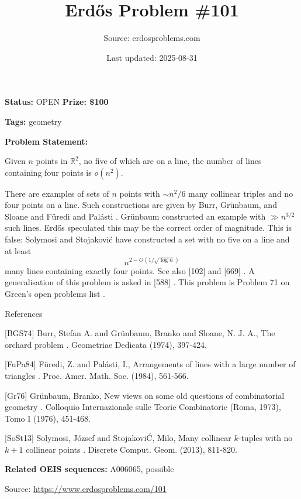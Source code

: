 \documentclass{article}
\title{Erd\H{o}s Problem \#101}
\date{Last updated: 2025-08-31}
\author{Source: erdosproblems.com}
\begin{document}
\maketitle

\noindent\textbf{Status:} OPEN \quad \textbf{Prize: \$100}

\noindent\textbf{Tags:} geometry

\medskip

\noindent\textbf{Problem Statement:}

Given $n$ points in $\mathbb{R}^2$, no five of which are on a line, the number of lines containing four points is $o(n^2)$.




There are examples of sets of $n$ points with $\sim n^2/6$ many collinear triples and no four points on a line. Such constructions are given by Burr, Gr\"{u}nbaum, and Sloane \cite{BGS74} and F\"{u}redi and Pal\'{a}sti \cite{FuPa84}. Gr\"{u}nbaum \cite{Gr76} constructed an example with $\gg n^{3/2}$ such lines. Erd\H{o}s speculated this may be the correct order of magnitude. This is false: Solymosi and Stojakovi\'{c} \cite{SoSt13} have constructed a set with no five on a line and at least\[n^{2-O(1/\sqrt{\log n})}\]many lines containing exactly four points. See also [102] and [669] . A generalisation of this problem is asked in [588] . This problem is Problem 71 on Green's open problems list .




References

[BGS74] Burr, Stefan A. and Gr\"{u}nbaum, Branko and Sloane, N. J. A., The orchard problem . Geometriae Dedicata (1974), 397-424.

[FuPa84] F\"{u}redi, Z. and Pal\'{a}sti, I., Arrangements of lines with a large number of triangles . Proc. Amer. Math. Soc. (1984), 561-566.

[Gr76] Gr\"{u}nbaum, Branko, New views on some old questions of combinatorial geometry . Colloquio Internazionale sulle Teorie Combinatorie (Roma, 1973), Tomo I (1976), 451-468.

[SoSt13] Solymosi, J\'{o}zsef and Stojakovi\'C, Milo\vS, Many collinear {$k$}-tuples with no {$k+1$} collinear points . Discrete Comput. Geom. (2013), 811-820.

\noindent\textbf{Related OEIS sequences:} A006065, possible


\bigskip
\noindent\small{Source: \url{https://www.erdosproblems.com/101}}
\end{document}
